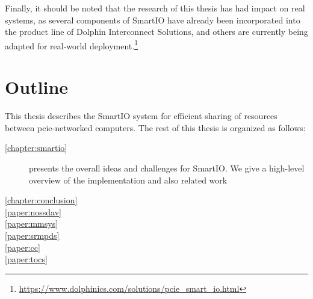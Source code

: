 %
Finally, it should be noted that the research of this thesis has had impact on real systems, as several components of SmartIO have already been incorporated into the product line of Dolphin Interconnect Solutions, and others are currently being adapted for real-world deployment.\footnote{{\url{https://www.dolphinics.com/solutions/pcie_smart_io.html}}}


\section{Outline}
This thesis describes the SmartIO system for efficient sharing of resources between \gls{pcie}-networked computers.
%
The rest of this thesis is organized as follows:
\begin{description}
    \item[\cref{chapter:smartio}]
        presents the overall ideas and challenges for SmartIO. 
        We give a high-level overview of the implementation and 
        also related work

    \item[\cref{chapter:conclusion}]

    \item[\cref{paper:nossdav}]

    \item[\cref{paper:mmsys}]

    \item[\cref{paper:srmpds}]

    \item[\cref{paper:cc}]

    \item[\cref{paper:tocs}]
\end{description}

